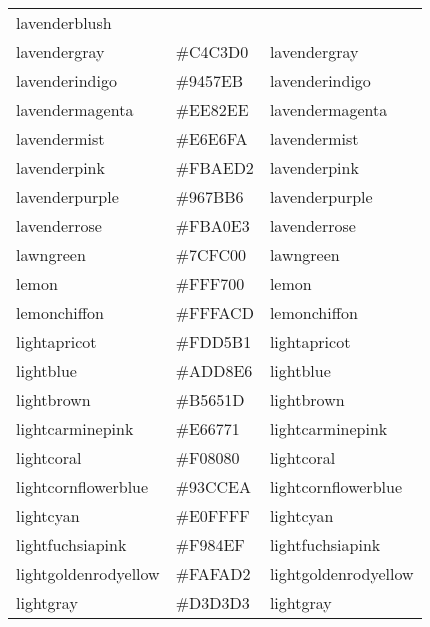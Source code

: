 \documentclass[
]{article}
\begin{document}
\begin{longtable}[]{@{}lll@{}}
\textcolor[rgb]{1.0,0.94,0.96}{lavenderblush         }\tabularnewline
lavendergray & \colorbox[rgb]{0.77,0.76,0.82}{\#C4C3D0} &
\textcolor[rgb]{0.77,0.76,0.82}{lavendergray          }\tabularnewline
lavenderindigo & \colorbox[rgb]{0.58,0.34,0.92}{\#9457EB} &
\textcolor[rgb]{0.58,0.34,0.92}{lavenderindigo        }\tabularnewline
lavendermagenta & \colorbox[rgb]{0.93,0.51,0.93}{\#EE82EE} &
\textcolor[rgb]{0.93,0.51,0.93}{lavendermagenta       }\tabularnewline
lavendermist & \colorbox[rgb]{0.9,0.9,0.98}{\#E6E6FA} &
\textcolor[rgb]{0.9,0.9,0.98}{lavendermist          }\tabularnewline
lavenderpink & \colorbox[rgb]{0.98,0.68,0.82}{\#FBAED2} &
\textcolor[rgb]{0.98,0.68,0.82}{lavenderpink          }\tabularnewline
lavenderpurple & \colorbox[rgb]{0.59,0.48,0.71}{\#967BB6} &
\textcolor[rgb]{0.59,0.48,0.71}{lavenderpurple        }\tabularnewline
lavenderrose & \colorbox[rgb]{0.98,0.63,0.89}{\#FBA0E3} &
\textcolor[rgb]{0.98,0.63,0.89}{lavenderrose          }\tabularnewline
lawngreen & \colorbox[rgb]{0.49,0.99,0.0}{\#7CFC00} &
\textcolor[rgb]{0.49,0.99,0.0}{lawngreen             }\tabularnewline
lemon & \colorbox[rgb]{1.0,0.97,0.0}{\#FFF700} &
\textcolor[rgb]{1.0,0.97,0.0}{lemon                 }\tabularnewline
lemonchiffon & \colorbox[rgb]{1.0,0.98,0.8}{\#FFFACD} &
\textcolor[rgb]{1.0,0.98,0.8}{lemonchiffon          }\tabularnewline
lightapricot & \colorbox[rgb]{0.99,0.84,0.69}{\#FDD5B1} &
\textcolor[rgb]{0.99,0.84,0.69}{lightapricot          }\tabularnewline
lightblue & \colorbox[rgb]{0.68,0.85,0.9}{\#ADD8E6} &
\textcolor[rgb]{0.68,0.85,0.9}{lightblue             }\tabularnewline
lightbrown & \colorbox[rgb]{0.71,0.4,0.11}{\#B5651D} &
\textcolor[rgb]{0.71,0.4,0.11}{lightbrown            }\tabularnewline
lightcarminepink & \colorbox[rgb]{0.9,0.4,0.38}{\#E66771} &
\textcolor[rgb]{0.9,0.4,0.38}{lightcarminepink      }\tabularnewline
lightcoral & \colorbox[rgb]{0.94,0.5,0.5}{\#F08080} &
\textcolor[rgb]{0.94,0.5,0.5}{lightcoral            }\tabularnewline
lightcornflowerblue & \colorbox[rgb]{0.6,0.81,0.93}{\#93CCEA} &
\textcolor[rgb]{0.6,0.81,0.93}{lightcornflowerblue   }\tabularnewline
lightcyan & \colorbox[rgb]{0.88,1.0,1.0}{\#E0FFFF} &
\textcolor[rgb]{0.88,1.0,1.0}{lightcyan             }\tabularnewline
lightfuchsiapink & \colorbox[rgb]{0.98,0.52,0.9}{\#F984EF} &
\textcolor[rgb]{0.98,0.52,0.9}{lightfuchsiapink      }\tabularnewline
lightgoldenrodyellow & \colorbox[rgb]{0.98,0.98,0.82}{\#FAFAD2} &
\textcolor[rgb]{0.98,0.98,0.82}{lightgoldenrodyellow  }\tabularnewline
lightgray & \colorbox[rgb]{0.83,0.83,0.83}{\#D3D3D3} &
\textcolor[rgb]{0.83,0.83,0.83}{lightgray             }\tabularnewline

\end{longtable}
\end{document}
